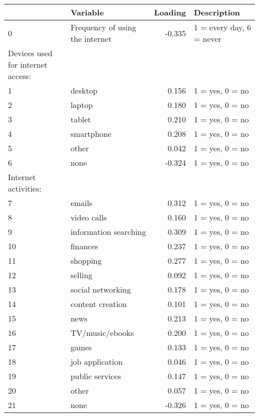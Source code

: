 \documentclass[11pt]{article}
\begin{document}
    \begin{tabular}{llrl}
        \toprule
        & Variable & Loading & Description \\
        \midrule
        0 & Frequency of using the internet & -0.335 & 1 = every day, 6 = never \\
        Devices used for internet access: &  &  &  \\
        1 & desktop & 0.156 & 1 = yes, 0 = no \\
        2 & laptop & 0.180 & 1 = yes, 0 = no \\
        3 & tablet & 0.210 & 1 = yes, 0 = no \\
        4 & smartphone & 0.208 & 1 = yes, 0 = no \\
        5 & other & 0.042 & 1 = yes, 0 = no \\
        6 & none & -0.324 & 1 = yes, 0 = no \\
        Internet activities: &  &  &  \\
        7 & emails & 0.312 & 1 = yes, 0 = no \\
        8 & video calls & 0.160 & 1 = yes, 0 = no \\
        9 & information searching & 0.309 & 1 = yes, 0 = no \\
        10 & finances & 0.237 & 1 = yes, 0 = no \\
        11 & shopping & 0.277 & 1 = yes, 0 = no \\
        12 & selling & 0.092 & 1 = yes, 0 = no \\
        13 & social networking & 0.178 & 1 = yes, 0 = no \\
        14 & content creation & 0.101 & 1 = yes, 0 = no \\
        15 & news & 0.213 & 1 = yes, 0 = no \\
        16 & TV/music/ebooks & 0.200 & 1 = yes, 0 = no \\
        17 & games & 0.133 & 1 = yes, 0 = no \\
        18 & job application & 0.046 & 1 = yes, 0 = no \\
        19 & public services & 0.147 & 1 = yes, 0 = no \\
        20 & other & 0.057 & 1 = yes, 0 = no \\
        21 & none & -0.326 & 1 = yes, 0 = no \\
        \bottomrule
    \end{tabular}
\end{document}

